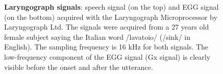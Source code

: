 \begin{figure}[htbp]
	\centering
	\caption[Laryngograph signals]{\textbf{Laryngograph signals}: speech signal 
	(on the top) and EGG signal (on the bottom) acquired with the Laryngograph
	Microprocessor by Laryngograph Ltd.
	The signals were acquired from a 27 years old female subject saying the
	Italian word /lavatoio/ (/sink/ in English).
	The sampling frequency is 16 kHz for both signals.
	The low-frequency component of the EGG signal (Gx signal) is clearly visible 
	before the onset and after the utterance. 
	}
	\label{fig:linguometer:lg:example}
\end{figure}
